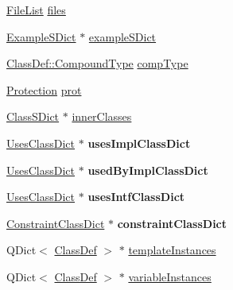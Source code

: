 \begin{DoxyCompactItemize}
\item 
\mbox{\hyperlink{class_file_list}{File\+List}} \mbox{\hyperlink{class_class_def_impl_a4d615eed35e81984df99b64bd9334e55}{files}}
\item 
\mbox{\hyperlink{class_example_s_dict}{Example\+S\+Dict}} $\ast$ \mbox{\hyperlink{class_class_def_impl_a256b7b66998ac4aaf0495a4133fa16a3}{example\+S\+Dict}}
\item 
\mbox{\hyperlink{class_class_def_ae70cf86d35fe954a94c566fbcfc87939}{Class\+Def\+::\+Compound\+Type}} \mbox{\hyperlink{class_class_def_impl_af8b4e7fb963b0feff4a8009a358bd90b}{comp\+Type}}
\item 
\mbox{\hyperlink{types_8h_a90e352184df58cd09455fe9996cd4ded}{Protection}} \mbox{\hyperlink{class_class_def_impl_a08fcc20edfd7a4c7090217f21389f929}{prot}}
\item 
\mbox{\hyperlink{class_class_s_dict}{Class\+S\+Dict}} $\ast$ \mbox{\hyperlink{class_class_def_impl_a3032dc0d393588b7afd0c2432b350feb}{inner\+Classes}}
\item 
\mbox{\label{class_class_def_impl_ac49d5feb5e7484ee50ae51873b8bc255}} 
\mbox{\hyperlink{class_uses_class_dict}{Uses\+Class\+Dict}} $\ast$ {\bfseries uses\+Impl\+Class\+Dict}
\item 
\mbox{\label{class_class_def_impl_a578c5fd5c2fb6e5aee107a670e9e51a1}} 
\mbox{\hyperlink{class_uses_class_dict}{Uses\+Class\+Dict}} $\ast$ {\bfseries used\+By\+Impl\+Class\+Dict}
\item 
\mbox{\label{class_class_def_impl_ab7e80405e26e2e111e5869c016cc9783}} 
\mbox{\hyperlink{class_uses_class_dict}{Uses\+Class\+Dict}} $\ast$ {\bfseries uses\+Intf\+Class\+Dict}
\item 
\mbox{\label{class_class_def_impl_ac07bb35d01da6f43d0e39af700ea55db}} 
\mbox{\hyperlink{class_constraint_class_dict}{Constraint\+Class\+Dict}} $\ast$ {\bfseries constraint\+Class\+Dict}
\item 
Q\+Dict$<$ \mbox{\hyperlink{class_class_def}{Class\+Def}} $>$ $\ast$ \mbox{\hyperlink{class_class_def_impl_a40568b5135505092ae7acae3e4ce224f}{template\+Instances}}
\item 
Q\+Dict$<$ \mbox{\hyperlink{class_class_def}{Class\+Def}} $>$ $\ast$ \mbox{\hyperlink{class_class_def_impl_ac515e81dfa0ea2fe1e7aabe14d65d488}{variable\+Instances}}

\end{DoxyCompactItemize}
